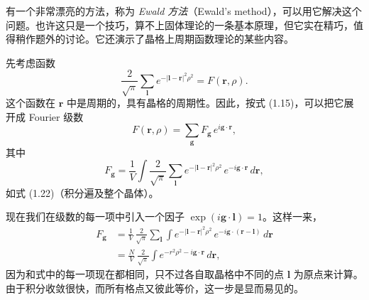 有一个非常漂亮的方法，称为 \emph{Ewald 方法}（Ewald's method），可以用它解决这个问题。也许这只是一个技巧，算不上固体理论的一条基本原理，但它实在精巧，值得稍作题外的讨论。它还演示了晶格上周期函数理论的某些内容。

先考虑函数
\begin{equation*}
\frac{2}{\sqrt{\pi}}\sum_{\boldsymbol{l}} e^{-|\boldsymbol{l}-\mathbf{r}|^2\rho^2} = F(\mathbf{r},\rho).
\tag{2.29}
\end{equation*}
这个函数在 $\mathbf{r}$ 中是周期的，具有晶格的周期性。因此，按式 (1.15)，可以把它展开成 Fourier 级数
\begin{equation*}
F(\mathbf{r},\rho) = \sum_{\boldsymbol{g}} F_{\boldsymbol{g}}\, e^{i\boldsymbol{g}\cdot\mathbf{r}},
\tag{2.30}
\end{equation*}
其中
\begin{equation*}
F_{\boldsymbol{g}} = \frac{1}{V}\int \frac{2}{\sqrt{\pi}}\sum_{\boldsymbol{l}} e^{-|\boldsymbol{l}-\mathbf{r}|^2\rho^2}\, e^{-i\boldsymbol{g}\cdot\mathbf{r}}\, d\mathbf{r},
\tag{2.31}
\end{equation*}
如式 (1.22)（积分遍及整个晶体）。

现在我们在级数的每一项中引入一个因子 $\exp(i\boldsymbol{g}\cdot\boldsymbol{l})=1$。这样一来，
\begin{align*}
F_{\boldsymbol{g}} &= \frac{1}{V}\,\frac{2}{\sqrt{\pi}}\sum_{\boldsymbol{l}}\int e^{-|\boldsymbol{l}-\mathbf{r}|^2\rho^2}\, e^{-i\boldsymbol{g}\cdot(\mathbf{r}-\boldsymbol{l})}\, d\mathbf{r} \\
&= \frac{N}{V}\,\frac{2}{\sqrt{\pi}}\int e^{-r^2\rho^2-i\boldsymbol{g}\cdot\mathbf{r}}\, d\mathbf{r},
\tag{2.32}
\end{align*}
因为和式中的每一项现在都相同，只不过各自取晶格中不同的点 $\boldsymbol{l}$ 为原点来计算。由于积分收敛很快，而所有格点又彼此等价，这一步是显而易见的。


